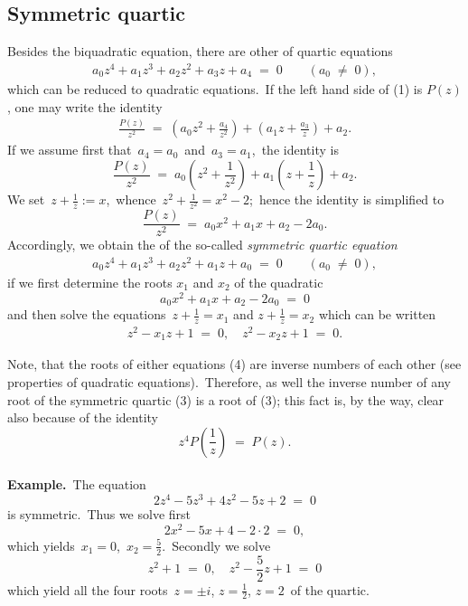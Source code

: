 \documentclass[12pt]{article}
\theoremstyle{definition}
\begin{document}
  

\subsection{Symmetric quartic}

Besides the biquadratic equation, there are other  of quartic equations 
\begin{align}
a_0z^4+a_1z^3+a_2z^2+a_3z+a_4 \;=\; 0 \qquad (a_0 \;\neq\; 0),
\end{align}
which can be reduced to quadratic equations.\, If the left hand side of (1) is $P(z)$, one may write the identity
\begin{align}
\frac{P(z)}{z^2} \;=\; \left(a_0z^2+\frac{a_4}{z^2}\right)+\left(a_1z+\frac{a_3}{z}\right)+a_2.
\end{align}
If we assume first that\, $a_4 = a_0$\, and\, $a_3 = a_1$,\, the identity is
$$\frac{P(z)}{z^2} \;=\; a_0\left(z^2+\frac{1}{z^2}\right)+a_1\left(z+\frac{1}{z}\right)+a_2.$$
We set \,$\displaystyle z+\frac{1}{z} := x$,\, whence\, $\displaystyle z^2+\frac{1}{z^2} = x^2-2$;\, hence the identity is simplified to
$$\frac{P(z)}{z^2} \;=\; a_0x^2+a_1x+a_2-2a_0.$$
Accordingly, we obtain the  of the so-called {\em symmetric quartic equation}
\begin{align}
a_0z^4+a_1z^3+a_2z^2+a_1z+a_0 \;=\; 0 \qquad (a_0 \;\neq\; 0),
\end{align}
if we first determine the roots $x_1$ and $x_2$ of the quadratic
$$a_0x^2+a_1x+a_2-2a_0 \;=\; 0$$
and then solve the equations\, $z+\frac{1}{z} = x_1$ and $z+\frac{1}{z} = x_2$
which can be written
\begin{align}
z^2-x_1z+1 \;=\; 0, \quad z^2-x_2z+1 \;=\; 0.
\end{align}

Note, that the roots of either equations (4) are inverse numbers of each other (see properties of quadratic equations).\, Therefore, as well the inverse number of any root of the symmetric quartic (3) is a root of (3); this fact is, by the way, clear also because of the identity
$$z^4P\!\left(\frac{1}{z}\right) \;=\; P(z).$$\\



\textbf{Example.}\, The equation
$$2z^4-5z^3+4z^2-5z+2 \;=\; 0$$
is symmetric.\, Thus we solve first
$$2x^2-5x+4-2\cdot2 \;=\; 0,$$
which yields\, $x_1 = 0$,\, $x_2 = \frac{5}{2}$.\, Secondly we solve
$$z^2+1 \;=\; 0, \quad z^2-\frac{5}{2}z+1 \;=\; 0$$
which yield all the four roots\, $z = \pm i$,\; $z = \frac{1}{2}$,\; $z = 2$\, of the quartic.\\
\end{document}
